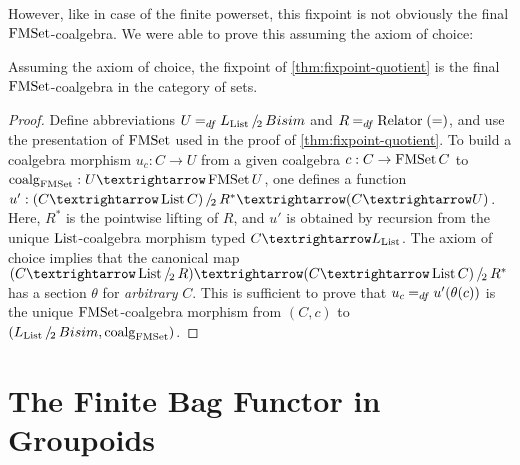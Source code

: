 \documentclass[final,a4paper,USenglish,cleveref]{lipics-v2021}
\begin{document}
However, like in case of the finite powerset, this fixpoint is not obviously the final $\FMSet$-coalgebra.
We were able to prove this assuming the axiom of choice:
\begin{theorem}\label{thm:final-quotient}
  Assuming the axiom of choice, the fixpoint of \cref{thm:fixpoint-quotient} is the final $\FMSet$-coalgebra in the category of sets.
\end{theorem}
\begin{proof}
  Define abbreviations $U \DefEq \SetQuot[\Lim{\List}][\Bisim]$ and $R \DefEq \Relator\; (=)$, and use the presentation of $\FMSet$ used in the proof of \cref{thm:fixpoint-quotient}.
  To build a coalgebra morphism $u_c : C → U$ from a given coalgebra $c : C \to \FMSet C$ to $\coalg{\FMSet} : U → \FMSet U$,
  one defines a function $u' : \SetQuot[(C → \List C)][R^*] → (C → U)$.
  Here, $R^*$ is the pointwise lifting of $R$,
  and $u'$ is obtained by recursion from the unique $\List$-coalgebra morphism typed $C → \Lim{\List}$.
  The axiom of choice implies that the canonical map $(C → \SetQuot[\List][R]) → \SetQuot[(C → \List C)][R^*]$
  has a section $\theta$ for \emph{arbitrary} $C$.
  This is sufficient to prove that $u_c \DefEq u'(\theta(c))$ is the unique $\FMSet$-coalgebra morphism from $(C,c)$ to $(\SetQuot[\Lim{\List}][\Bisim], \coalg{\FMSet})$.
\end{proof}


\section{The Finite Bag Functor in Groupoids}\label{sec:finite-bags-groupoids}
\end{document}
